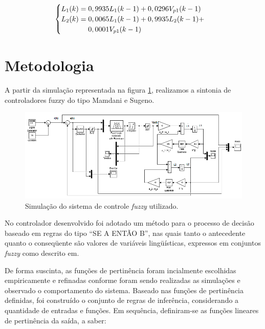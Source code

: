 \documentclass[
	twoside,				%
	twocolumn,				%
	english,				%
	brazil,					%
]{article}
\begin{document}
\begin{equation}
\label{eq:discrete}
\begin{cases}
L_{1}(k) = 0,9935 L_{1}(k-1) + 0,0296V_{p1}(k-1) \\
L_{2}(k) = 0,0065L_{1}(k-1)+0,9935L_{2}(k-1)+ \\ 
\hspace{1.33cm}0,0001V_{p1}(k-1)
\end{cases}
\end{equation}


\section{Metodologia}\label{metodologia}

A partir da simulação representada na figura \ref{img:simulink}, realizamos a sintonia de controladores fuzzy do tipo Mamdani e Sugeno.

\begin{figure}[!ht]
    \centering
    \includegraphics[scale=0.4]{simulink.png}
    \caption { Simulação do sistema de controle \textit{fuzzy} utilizado. }
	\label{img:simulink}
\end{figure}

No controlador desenvolvido foi adotado um método para o processo de decisão baseado em regras do tipo “SE A ENTÃO B”, nas quais tanto o antecedente quanto o conseqüente são valores de variáveis lingüísticas, expressos em conjuntos \textit{fuzzy} como descrito em\cite{MamdaniAssilian:1975}.

De forma suscinta, as funções de pertinência foram incialmente escolhidas empiricamente e refinadas conforme foram sendo realizadas as simulações e observado o comportamento do sistema. Baseado nas funções de pertinência definidas, foi construído o conjunto de regras de inferência, considerando a quantidade de entradas e funções. Em sequência, definiram-se as funções lineares de pertinência da saída, a saber:
\end{document}

